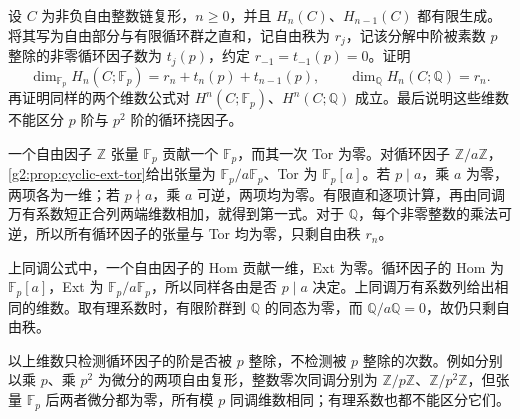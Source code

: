 \begin{exercise}\label{g2:ex:mod-p-betti-count}
	设 \(C\) 为非负自由整数链复形，\(n\ge0\)，并且 \(H_n(C)\)、\(H_{n-1}(C)\) 都有限生成。将其写为自由部分与有限循环群之直和，记自由秩为 \(r_j\)，记该分解中阶被素数 \(p\) 整除的非零循环因子数为 \(t_j(p)\)，约定 \(r_{-1}=t_{-1}(p)=0\)。证明
	\[
		\dim_{\mathbb F_p}H_n(C;\mathbb F_p)=r_n+t_n(p)+t_{n-1}(p),\qquad
		\dim_{\mathbb Q}H_n(C;\mathbb Q)=r_n.
	\]
	再证明同样的两个维数公式对 \(H^n(C;\mathbb F_p)\)、\(H^n(C;\mathbb Q)\) 成立。最后说明这些维数不能区分 \(p\) 阶与 \(p^2\) 阶的循环挠因子。
\end{exercise}
\begin{solution}
	一个自由因子 \(\mathbb Z\) 张量 \(\mathbb F_p\) 贡献一个 \(\mathbb F_p\)，而其一次 Tor 为零。对循环因子 \(\mathbb Z/a\mathbb Z\)，\cref{g2:prop:cyclic-ext-tor}给出张量为 \(\mathbb F_p/a\mathbb F_p\)、Tor 为 \(\mathbb F_p[a]\)。若 \(p\mid a\)，乘 \(a\) 为零，两项各为一维；若 \(p\nmid a\)，乘 \(a\) 可逆，两项均为零。有限直和逐项计算，再由同调万有系数短正合列两端维数相加，就得到第一式。对于 \(\mathbb Q\)，每个非零整数的乘法可逆，所以所有循环因子的张量与 Tor 均为零，只剩自由秩 \(r_n\)。

	上同调公式中，一个自由因子的 Hom 贡献一维，Ext 为零。循环因子的 Hom 为 \(\mathbb F_p[a]\)，Ext 为 \(\mathbb F_p/a\mathbb F_p\)，所以同样各由是否 \(p\mid a\) 决定。上同调万有系数列给出相同的维数。取有理系数时，有限阶群到 \(\mathbb Q\) 的同态为零，而 \(\mathbb Q/a\mathbb Q=0\)，故仍只剩自由秩。

	以上维数只检测循环因子的阶是否被 \(p\) 整除，不检测被 \(p\) 整除的次数。例如分别以乘 \(p\)、乘 \(p^2\) 为微分的两项自由复形，整数零次同调分别为 \(\mathbb Z/p\mathbb Z\)、\(\mathbb Z/p^2\mathbb Z\)，但张量 \(\mathbb F_p\) 后两者微分都为零，所有模 \(p\) 同调维数相同；有理系数也都不能区分它们。
\end{solution}

